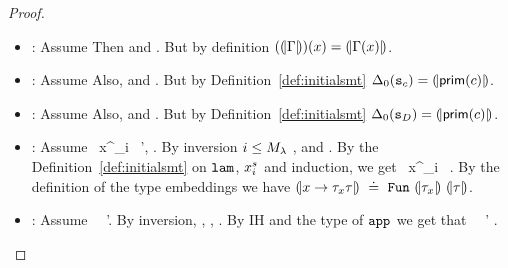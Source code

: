 \begin{proof}
\begin{itemize}
\item \lgvar : 
Assume 
Then 
    and 
   .
But by definition 
  $((\!|\Gamma|\!)) (x) = (\!|\Gamma(x)|\!)$. 

\item \lgpop : 
Assume 
Also, 
    and 
   .
But by Definition~\ref{def:initialsmt}
  $\Delta_0 (\texttt{s}_{c}) = (\!|\mathsf{prim}(c)|\!)$. 

\item \lgdc : 
Assume 
	\tologicshort{\env}{\dc}{\constty{\dc}}{\smtvar{\dc}}{\embed{\constty{\dc}}}{\emptyset}{\emptyaxioms}
Also, 
   \hastype{\env}{\dc}{\constty{\dc}} and 
   \smthastype{\smtenvinit, \embed{\env}}{\smtvar{\dc}}{\smtenvinit (\smtvar{\dc})}.
But by Definition~\ref{def:initialsmt}
  $\Delta_0(\texttt{s}_{D}) = (\!|\mathsf{prim}(c)|\!)$. 

\item \lgfun : 
Assume 
	        {\ {x^{}_{i}}\ {\pred}}
	        {\sort'}{\smtenv, }{}. 
By inversion 
    $i \leq  {M_\lambda} $
	, and
  	.
By the Definition~\ref{def:initialsmt} on $\texttt{lam}^{}_{}$, $x^{s}_i$ and induction, we get
   \smthastype{\smtenvinit, \embed{\env}}
     {\ {x^{}_{i}}\ {\pred}}
     {}.
By the definition of the type embeddings we have
$\embed{\tfunbasic{x}{\typ_x}{\typ}} \defeq \tsmtfun{\embed{\typ_x}}{\embed{\typ}}$.


\item \lgapp : 
Assume 
  {\ {\pred}\ {\pred'}}{\embed{\typ}}{\smtenv}{}. 
By inversion, 
	, 
	,
	. 
By IH and the type of $\texttt{app}^{}_{}$ we get that 
   \smthastype{\smtenvinit, \embed{\env}}
     {\ {\pred}\ {\pred'}}
     {\embed{\typ}}.


\end{itemize}
\end{proof}
